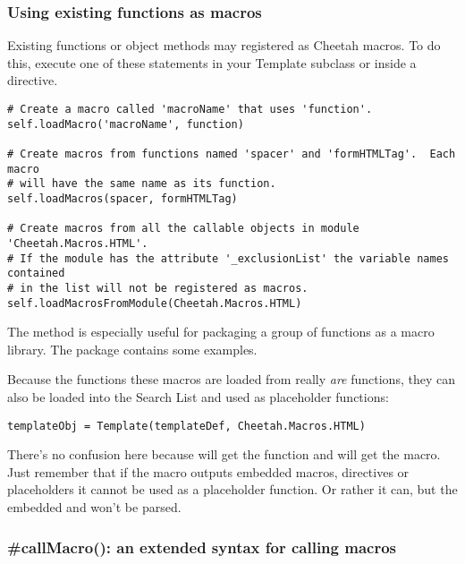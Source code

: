 \subsubsection{Using existing functions as macros}

Existing functions or object methods may registered as Cheetah macros.  To do
this, execute one of these statements in your Template subclass or inside a
 directive.  

\begin{verbatim}
# Create a macro called 'macroName' that uses 'function'.
self.loadMacro('macroName', function)

# Create macros from functions named 'spacer' and 'formHTMLTag'.  Each macro
# will have the same name as its function.
self.loadMacros(spacer, formHTMLTag)

# Create macros from all the callable objects in module 'Cheetah.Macros.HTML'.
# If the module has the attribute '_exclusionList' the variable names contained
# in the list will not be registered as macros.
self.loadMacrosFromModule(Cheetah.Macros.HTML)
\end{verbatim}

The  method is especially useful for
packaging a group of functions as a macro library.  The 
package contains some examples.

Because the functions these macros are loaded from really {\em are} functions,
they can also be loaded into the Search List and used as placeholder functions:

\begin{verbatim}
templateObj = Template(templateDef, Cheetah.Macros.HTML)
\end{verbatim}

There's no confusion here because  will get the function and
 will get the macro.  Just remember that if the macro outputs
embedded macros, directives or placeholders it cannot be used as a placeholder
function.  Or rather it can, but the embedded  and
 won't be parsed.

\subsubsection{\#callMacro(): an extended syntax for calling macros}
\label{directives.macros.callMacro}

